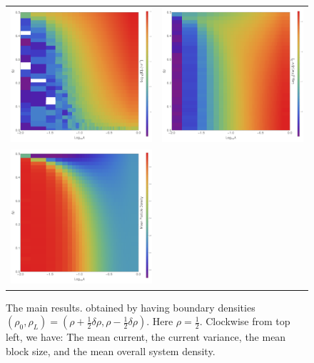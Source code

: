 \begin{figure} \caption[Results obtained by fixing the average of the boundary densities and varying their difference and $\lambda$]{The main results. obtained by having boundary densities 
$(\rho_0, \rho_L)=(\rho + \frac{1}{2} \delta \rho , \rho - \frac{1}{2} \delta \rho)$. 
Here $\rho=\frac{1}{2}$. Clockwise from top left, we have: The mean current, the current variance,
the mean block size, and the mean overall system density.} 
\label{fig:constDens}
\begin{center}
\begin{tabular}{c c} 
\includegraphics[width=0.49\linewidth]{numerics/images/lambdaConcDiff/current} & \includegraphics[width=0.49\linewidth]{numerics/images/lambdaConcDiff/currentVar} \\
\includegraphics[width=0.49\linewidth]{numerics/images/lambdaConcDiff/density} &

\end{tabular}
\end{center}
\end{figure}
